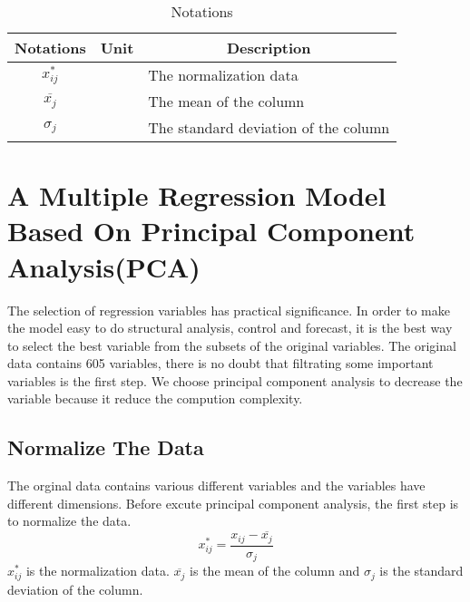 \documentclass[]{article}
\title{}
\author{}
\begin{document}
\maketitle

\begin{table}[htb]\renewcommand{\arraystretch}{1.4}
	\centering
	\caption{Notations}
	\label{notations}
	\begin{tabular}{c c l}
		\hline
		Notations           & Unit                & \multicolumn{1}{c}{Description}              \\ \hline
		 $x_{ij}^{*}$  & \/ & The normalization data \\
		 $\overline{x_{j}}$ &\/ & The mean of the column\\
		 $\sigma_{j}$ &\/ &The standard deviation of the column\\ \hline
	\end{tabular}
\end{table}

\section{A Multiple Regression Model Based On Principal Component Analysis(PCA) }


The selection of regression variables has practical significance.  In order to make the model easy to do structural analysis,  control and forecast,  it is the best way to select the best variable from the subsets of the original variables.  The original data contains 605 variables,  there is no doubt that filtrating some important variables is the first step.  We choose principal component analysis to decrease the variable because it reduce the compution complexity.
\subsection{Normalize The Data}
The orginal data contains various different variables and the variables have different dimensions.  Before excute principal component analysis, the first step is to normalize the data.
\begin{equation}
    x_{ij}^{*} = \frac{x_{ij}-\overline{x_{j}}}{\sigma_{j}}  
\end{equation}
$x_{ij}^{*} $  is the normalization data.  $\overline{x_{j}}$  is the mean of the column and $\sigma_{j}$  is the standard deviation of the column.
\end{document}
